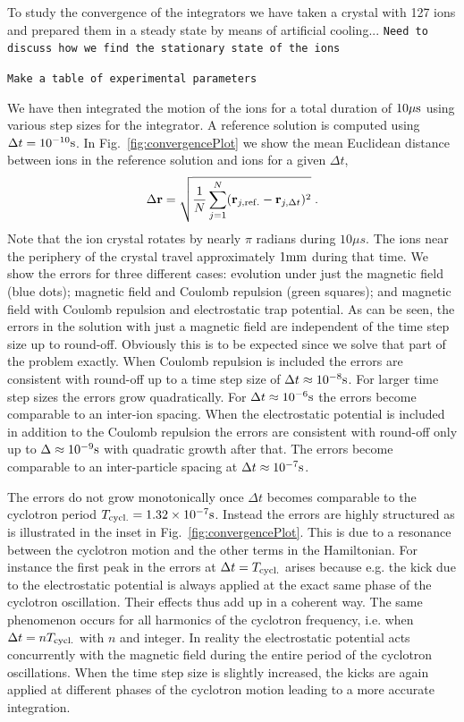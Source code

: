 \documentclass[
  aps,
  reprint,
  twoside,
  showpacs,
  amsmath,
  amssymb,
  floatfix
]{revtex4-1}
\newcommand{\domcomment}[1]{{\tt #1}}
\begin{document}
To study the convergence of the integrators we have taken a crystal with
127 ions and prepared them in a steady state by means of artificial
cooling...
\domcomment{Need to discuss how we find the stationary state of the
  ions}

\domcomment{Make a table of experimental parameters}

We have then integrated the motion of the ions for a total duration of
$10\mu {\rm s}$ using various step sizes for the integrator.  A
reference solution is computed using $\Delta t=10^{-10}{\rm s}$.  In
Fig.~\ref{fig:convergencePlot} we show the mean Euclidean distance
between ions in the reference solution and ions for a given $\Delta t$,
\begin{equation}
\Delta \mathbf{r} = \sqrt{\frac{1}{N}\sum_{j=1}^N(\mathbf{r}_{j,{\rm
    ref.}}-\mathbf{r}_{j,{\Delta t}})^2}\;.
\end{equation}
Note that the ion crystal rotates by nearly $\pi$ radians during $10\mu
s$.  The ions near the periphery of the crystal travel approximately
$1{\rm mm}$ during that time.
We show the errors for three different cases: evolution under just the
magnetic field (blue dots); magnetic field and Coulomb repulsion (green
squares); and magnetic field with Coulomb repulsion and electrostatic
trap potential.  As can be seen, the errors in the solution with just a
magnetic field are independent of the time step size up to round-off.
Obviously this is to be expected since we solve that part of the problem
exactly.  When Coulomb repulsion is included the errors are consistent
with round-off up to a time step size of $\Delta t\approx 10^{-8}{\rm
s}$.  For larger time step sizes the errors grow quadratically.  For
$\Delta t\approx 10^{-6}{\rm s}$ the errors become comparable to an
inter-ion spacing.  When
the electrostatic potential is included in addition to the Coulomb
repulsion the errors are consistent with round-off only up to
$\Delta\approx 10^{-9}{\rm s}$ with quadratic growth after that.  The
errors become comparable to an inter-particle spacing at $\Delta
t\approx 10^{-7}{\rm s}$.

The errors do not grow monotonically once $\Delta t$ becomes comparable
to the cyclotron period $T_{\rm cycl.}=1.32\times 10^{-7}{\rm s}$.
Instead the errors are highly structured as is illustrated in the inset
in Fig.~\ref{fig:convergencePlot}.  This is due to a resonance between
the cyclotron motion and the other terms in the Hamiltonian.  For
instance the first peak in the errors at $\Delta t = T_{\rm cycl.}$
arises because e.g. the kick due to the electrostatic potential is
always applied at the exact same phase of the cyclotron oscillation.
Their effects thus add up in a coherent way.  The same phenomenon occurs
for all harmonics of the cyclotron frequency, i.e. when $\Delta t = n
T_{\rm cycl.}$ with $n$ and integer.  In reality the electrostatic
potential acts concurrently with the magnetic field during the entire
period of the cyclotron oscillations.  When the time step size is
slightly increased, the kicks are again applied at different phases of
the cyclotron motion leading to a more accurate integration.   
\end{document}
